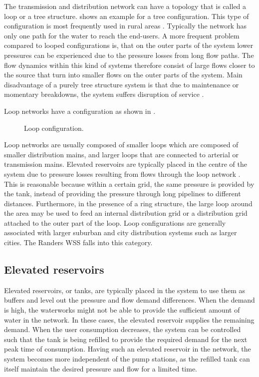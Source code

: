 The transmission and distribution network can have a topology that is called a loop or a tree structure.  shows an example for a tree configuration. This type of configuration is most frequently used in rural areas \cite{mays}. Typically the network has only one path for the water to reach the end-users. A more frequent problem compared to looped configurations is, that on the outer parts of the system lower pressures can be experienced due to the pressure losses from long flow paths. The flow dynamics within this kind of systems therefore consist of large flows closer to the source that turn into smaller flows on the outer parts of the system. Main disadvantage of a purely tree structure system is that due to maintenance or momentary breakdowns, the system suffers disruption of service \cite{mays}. 

Loop networks have a configuration as shown in . 

\begin{figure}[H]
\centering
 
\caption{Loop configuration.}
\label{fig:loop_configuration}
\end{figure}

Loop networks are usually composed of smaller loops which are composed of smaller distribution mains, and larger loops that are connected to arterial or transmission mains. Elevated reservoirs are typically placed in the centre of the system due to pressure losses resulting from flows through the loop network \cite{council2007drinking}. This is reasonable because within a certain grid, the same pressure is provided by the tank, instead of providing the pressure through long pipelines to different distances. Furthermore, in the presence of a ring structure, the large loop around the area may be used to feed an internal distribution grid or a distribution grid attached to the outer part of the loop. Loop configurations are generally associated with larger suburban and city distribution systems such as larger cities\cite{council2007drinking}. The Randers WSS falls into this category. 

\subsection{Elevated reservoirs}
\label{elevated_reservoirs}

Elevated reservoirs, or tanks, are typically placed in the system to use them as buffers and level out the pressure and flow demand differences. When the demand is high, the waterworks might not be able to provide the sufficient amount of water in the network. In these cases, the elevated reservoir supplies the remaining demand. When the user consumption decreases, the system can be controlled such that the tank is being refilled to provide the required demand for the next peak time of consumption. Having such an elevated reservoir in the network, the system becomes more independent of the pump stations, as the refilled tank can itself maintain the desired pressure and flow for a limited time. 

